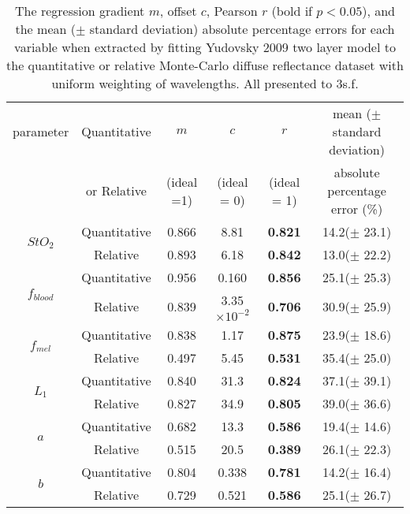 \begin{table}[h]
    \centering
    \caption{The regression gradient $m$, offset $c$, Pearson $r$ (bold if $p<0.05$), and the mean ($\pm$ standard deviation) absolute percentage errors for each variable when extracted by fitting Yudovsky 2009 two layer model to the quantitative or relative Monte-Carlo diffuse reflectance dataset with uniform weighting of wavelengths. All presented to 3s.f.}
    \begin{tabular}{|c|c|cccc|}
        \hline
        parameter & Quantitative & $m$ & $c$ & $r$ & mean ($\pm$ standard deviation) \\
        & or Relative & (ideal =1) & (ideal = 0) & (ideal = 1) & absolute percentage error (\%)\\
        \hline
        \multirow{2}{*}{$StO_2$} & Quantitative & 0.866 & 8.81 & \textbf{0.821} & 14.2($\pm$ 23.1) \\
        & Relative & 0.893 & 6.18 & \textbf{0.842} & 13.0($\pm$ 22.2) \\
        \hline
        \multirow{2}{*}{$f_{blood}$} & Quantitative & 0.956 & 0.160 & \textbf{0.856} & 25.1($\pm$ 25.3) \\
        & Relative & 0.839 & 3.35$\times 10^{-2}$ & \textbf{0.706} & 30.9($\pm$ 25.9) \\
        \hline
        \multirow{2}{*}{$f_{mel}$} & Quantitative & 0.838 & 1.17 & \textbf{0.875} & 23.9($\pm$ 18.6) \\
        & Relative & 0.497 & 5.45 & \textbf{0.531} & 35.4($\pm$ 25.0) \\
        \hline
        \multirow{2}{*}{$L_1$} & Quantitative & 0.840 & 31.3 & \textbf{0.824} & 37.1($\pm$ 39.1) \\
         & Relative & 0.827 & 34.9 & \textbf{0.805} & 39.0($\pm$ 36.6) \\
        \hline
        \multirow{2}{*}{$a$} & Quantitative & 0.682 & 13.3 & \textbf{0.586} & 19.4($\pm$ 14.6) \\
        & Relative & 0.515 & 20.5 & \textbf{0.389} & 26.1($\pm$ 22.3) \\
        \hline
        \multirow{2}{*}{$b$} & Quantitative & 0.804 & 0.338 & \textbf{0.781} & 14.2($\pm$ 16.4) \\
        & Relative & 0.729 & 0.521 & \textbf{0.586} & 25.1($\pm$ 26.7) \\
        \hline
    \end{tabular}
    \label{tb:doubleparamtrendsuniform}
\end{table}
\FloatBarrier

